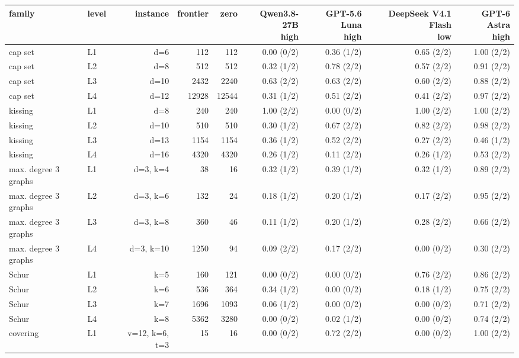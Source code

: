 \begin{tabular}{@{}llrrrrrrr@{}}
\toprule
family & level & instance & frontier & zero & \shortstack{Qwen3.8-27B\\high} & \shortstack{GPT-5.6 Luna\\high} & \shortstack{DeepSeek V4.1 Flash\\low} & \shortstack{GPT-6 Astra\\high} \\
\midrule
cap set & L1 & d=6 & 112 & 112 & 0.00 (0/2) & 0.36 (1/2) & 0.65 (2/2) & 1.00 (2/2) \\
cap set & L2 & d=8 & 512 & 512 & 0.32 (1/2) & 0.78 (2/2) & 0.57 (2/2) & 0.91 (2/2) \\
cap set & L3 & d=10 & 2432 & 2240 & 0.63 (2/2) & 0.63 (2/2) & 0.60 (2/2) & 0.88 (2/2) \\
cap set & L4 & d=12 & 12928 & 12544 & 0.31 (1/2) & 0.51 (2/2) & 0.41 (2/2) & 0.97 (2/2) \\
kissing & L1 & d=8 & 240 & 240 & 1.00 (2/2) & 0.00 (0/2) & 1.00 (2/2) & 1.00 (2/2) \\
kissing & L2 & d=10 & 510 & 510 & 0.30 (1/2) & 0.67 (2/2) & 0.82 (2/2) & 0.98 (2/2) \\
kissing & L3 & d=13 & 1154 & 1154 & 0.36 (1/2) & 0.52 (2/2) & 0.27 (2/2) & 0.46 (1/2) \\
kissing & L4 & d=16 & 4320 & 4320 & 0.26 (1/2) & 0.11 (2/2) & 0.26 (1/2) & 0.53 (2/2) \\
max. degree 3 graphs & L1 & d=3, k=4 & 38 & 16 & 0.32 (1/2) & 0.39 (1/2) & 0.32 (1/2) & 0.89 (2/2) \\
max. degree 3 graphs & L2 & d=3, k=6 & 132 & 24 & 0.18 (1/2) & 0.20 (1/2) & 0.17 (2/2) & 0.95 (2/2) \\
max. degree 3 graphs & L3 & d=3, k=8 & 360 & 46 & 0.11 (1/2) & 0.20 (1/2) & 0.28 (2/2) & 0.66 (2/2) \\
max. degree 3 graphs & L4 & d=3, k=10 & 1250 & 94 & 0.09 (2/2) & 0.17 (2/2) & 0.00 (0/2) & 0.30 (2/2) \\
Schur & L1 & k=5 & 160 & 121 & 0.00 (0/2) & 0.00 (0/2) & 0.76 (2/2) & 0.86 (2/2) \\
Schur & L2 & k=6 & 536 & 364 & 0.34 (1/2) & 0.00 (0/2) & 0.18 (1/2) & 0.75 (2/2) \\
Schur & L3 & k=7 & 1696 & 1093 & 0.06 (1/2) & 0.00 (0/2) & 0.00 (0/2) & 0.71 (2/2) \\
Schur & L4 & k=8 & 5362 & 3280 & 0.00 (0/2) & 0.02 (1/2) & 0.00 (0/2) & 0.74 (2/2) \\
covering & L1 & v=12, k=6, t=3 & 15 & 16 & 0.00 (0/2) & 0.72 (2/2) & 0.00 (0/2) & 1.00 (2/2) \\

\end{tabular}
